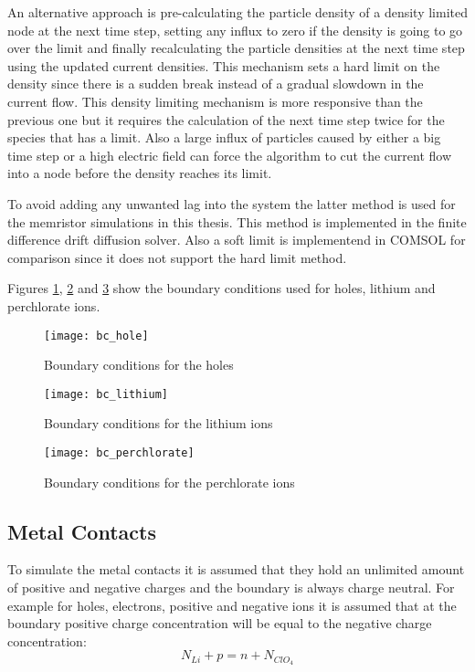 \begin{doublespace}
An alternative approach is pre-calculating the particle density of a density limited node at the next time step, setting any influx to zero if the density is going to go over the limit and finally recalculating the particle densities at the next time step using the updated current densities. This mechanism sets a hard limit on the density since there is a sudden break instead of a gradual slowdown in the current flow. This density limiting mechanism is more responsive than the previous one but it requires the calculation of the next time step twice for the species that has a limit. Also a large influx of particles caused by either a big time step or a high electric field can force the algorithm to cut the current flow into a node before the density reaches its limit.

To avoid adding any unwanted lag into the system the latter method is used for the memristor simulations in this thesis. This method is implemented in the finite difference drift diffusion solver. Also a soft limit is implementend in  COMSOL\tjs{}\cite{Comsol} for comparison since it does not support the hard limit method.

Figures \ref{bc_hole}, \ref{bc_lithium} and \ref{bc_perchlorate} show the boundary conditions used for holes, lithium and perchlorate ions.

\begin{figure}[!htp]
\centering
\texttt{[image: bc\_hole]}
\caption{Boundary conditions for the holes } 
\label{bc_hole}
\end{figure}

\begin{figure}[!htp]
\centering
\texttt{[image: bc\_lithium]}
\caption{Boundary conditions for the lithium ions } 
\label{bc_lithium}
\end{figure}

\begin{figure}[!htp]
\centering
\texttt{[image: bc\_perchlorate]}
\caption{Boundary conditions for the perchlorate ions } 
\label{bc_perchlorate}
\end{figure}


\subsection{Metal Contacts}
To simulate the metal contacts it is assumed that they hold an unlimited amount of positive and negative charges and the boundary is always charge neutral. For example for holes, electrons,  positive and negative ions it is assumed that at the boundary positive charge concentration will be equal to the negative charge concentration:
\begin{equation}
 N_{Li} + p = n + N_{ClO_{4}}
\label{chargeneutrality}
\end{equation}


\end{doublespace}
